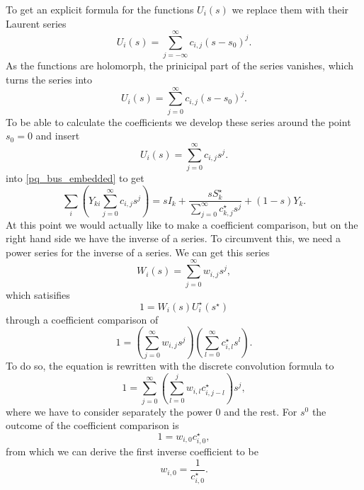 To get an explicit formula for the functions $U_i(s)$ we replace them with their Laurent series
\begin{equation}
	U_i(s) = \sum_{j = -\infty}^\infty c_{i,j} (s - s_0)^j.
\end{equation}
As the functions are holomorph, the prinicipal part of the series vanishes, which turns the series into
\begin{equation}
	U_i(s) = \sum_{j = 0}^\infty c_{i,j} (s - s_0)^j.
\end{equation}
To be able to calculate the coefficients we develop these series around the point $s_0 = 0$ and insert
\begin{equation}
	U_i(s) = \sum_{j = 0}^\infty c_{i,j} s^j.
	\label{eq:helm_series}
\end{equation}
into \eqref{pq_bus_embedded} to get
\begin{equation}
		\sum_i \left( Y_{ki} \sum_{j = 0}^\infty c_{i,j} s^j \right) = s I_k + \frac{s S_k^\star}{\sum_{j = 0}^\infty c_{k,j}^\star s^j} + (1 - s) Y_k.
		\label{eq:helm_series_pq_bus}
\end{equation}
At this point we would actually like to make a coefficient comparison, but on the right hand side we have the inverse of a series. To circumvent this, we need a power series for the inverse of a series. We can get this series
\begin{equation}
	W_i(s) = \sum_{j = 0}^\infty w_{i,j} s^j,
\end{equation}
which satisifies
\begin{equation}
	1 = W_i(s) U_i^\star(s^\star)
\end{equation}
through a coefficient comparison of
\begin{equation}
	1 = \left( \sum_{j = 0}^\infty w_{i,j} s^j \right) \left( \sum_{l = 0}^\infty c_{i,l}^\star s^l \right).
\end{equation}
To do so, the equation is rewritten with the discrete convolution formula to
\begin{equation}
	1 = \sum_{j = 0}^\infty \left( \sum_{l = 0}^j w_{i,l} c_{i,j - l}^\star \right) s^j,
\end{equation}
where we have to consider separately the power 0 and the rest. For $s^0$ the outcome of the coefficient comparison is
\begin{equation}
	1 = w_{i,0} c_{i,0}^\star,
\end{equation}
from which we can derive the first inverse coefficient to be
\begin{equation}
	w_{i,0} = \frac{1}{c_{i,0}^\star}.
\end{equation}
